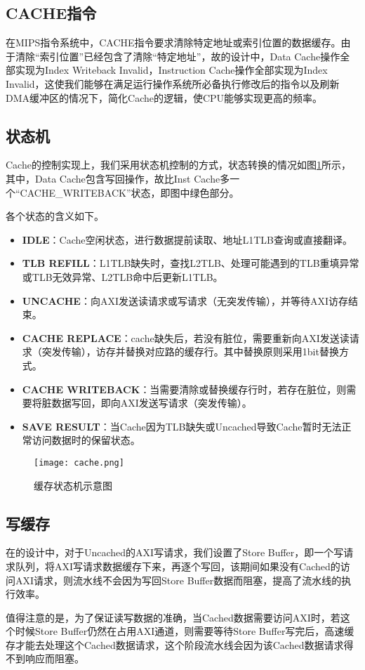 \subsection{CACHE指令}
在MIPS指令系统中，CACHE指令要求清除特定地址或索引位置的数据缓存。由于清除“索引位置”已经包含了清除“特定地址”，故\cpuname 的设计中，Data Cache操作全部实现为Index Writeback Invalid，Instruction Cache操作全部实现为Index Invalid，这使我们能够在满足运行操作系统所必备执行修改后的指令以及刷新DMA缓冲区的情况下，简化Cache的逻辑，使CPU能够实现更高的频率。

\subsection{状态机}
Cache的控制实现上，我们采用状态机控制的方式，状态转换的情况如图\ref{img:cache}所示，其中，Data Cache包含写回操作，故比Inst Cache多一个“CACHE\_WRITEBACK”状态，即图中绿色部分。

各个状态的含义如下。
\begin{itemize}
    \item \textbf{IDLE}：Cache空闲状态，进行数据提前读取、地址L1TLB查询或直接翻译。
    \item \textbf{TLB REFILL}：L1TLB缺失时，查找L2TLB、处理可能遇到的TLB重填异常或TLB无效异常、L2TLB命中后更新L1TLB。
    \item \textbf{UNCACHE}：向AXI发送读请求或写请求（无突发传输），并等待AXI访存结束。
    \item \textbf{CACHE REPLACE}：cache缺失后，若没有脏位，需要重新向AXI发送读请求（突发传输），访存并替换对应路的缓存行。其中替换原则采用1bit替换方式。
    \item \textbf{CACHE WRITEBACK}：当需要清除或替换缓存行时，若存在脏位，则需要将脏数据写回，即向AXI发送写请求（突发传输）。
    \item \textbf{SAVE RESULT}：当Cache因为TLB缺失或Uncached导致Cache暂时无法正常访问数据时的保留状态。
\end{itemize}

\begin{figure}[htpb]
    \centering
    \texttt{[image: cache.png]}
    \caption{\cpuname 缓存状态机示意图}
    \label{img:cache}
\end{figure}

\subsection{写缓存}
在\cpuname 的设计中，对于Uncached的AXI写请求，我们设置了Store Buffer，即一个写请求队列，将AXI写请求数据缓存下来，再逐个写回，该期间如果没有Cached的访问AXI请求，则流水线不会因为写回Store Buffer数据而阻塞，提高了流水线的执行效率。

值得注意的是，为了保证读写数据的准确，当Cached数据需要访问AXI时，若这个时候Store Buffer仍然在占用AXI通道，则需要等待Store Buffer写完后，高速缓存才能去处理这个Cached数据请求，这个阶段流水线会因为该Cached数据请求得不到响应而阻塞。